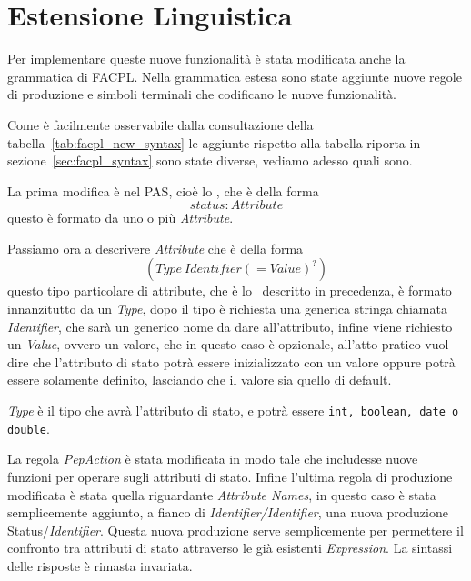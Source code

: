 \section{Estensione Linguistica} %
\label{sec:estensione_linguistica}
Per implementare queste nuove funzionalità è stata modificata anche la grammatica di FACPL.
Nella grammatica estesa sono state aggiunte nuove regole di produzione e simboli terminali che 
codificano le nuove funzionalità.\\ \par

Come è facilmente osservabile dalla consultazione della tabella~\ref{tab:facpl_new_syntax} le aggiunte rispetto alla tabella riporta in sezione~\ref{sec:facpl_syntax} sono state diverse, vediamo adesso quali sono.\\ \par
La prima modifica è nel PAS, cioè  lo \status, che è della forma $$status: Attribute$$ questo è formato da uno o più \textit{Attribute}.\\ \par
Passiamo ora a descrivere \textit{Attribute} che è della forma $$(Type\ Identifier (= Value)^?)$$
questo tipo particolare di attribute, che è lo \statusattribute \ descritto in precedenza, è formato innanzitutto da un \textit{Type}, dopo il tipo è richiesta una generica stringa chiamata \textit{Identifier}, che sarà un generico nome da dare all'attributo, infine viene richiesto un \textit{Value}, ovvero un valore, che in questo caso è opzionale, all'atto pratico vuol dire che l'attributo di stato potrà essere inizializzato con un valore oppure potrà essere solamente definito, lasciando che il valore sia quello di default.

\textit{Type} è il tipo che avrà l'attributo di stato, e potrà essere \texttt{int, boolean, date o double}.\\ \par
La regola \textit{PepAction} è stata modificata in modo tale che includesse nuove funzioni per operare sugli attributi di stato.
Infine l'ultima regola di produzione modificata è stata quella riguardante \textit{Attribute Names}, in questo caso è stata semplicemente aggiunto, a fianco di \textit{Identifier/Identifier}, una nuova produzione Status/\textit{Identifier}. Questa nuova produzione serve semplicemente per permettere il confronto tra attributi di stato attraverso le già esistenti \textit{Expression}.
La sintassi delle risposte è rimasta invariata.


